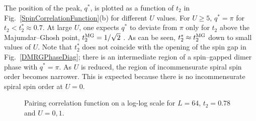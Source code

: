 The position of the peak, $q^\ast$, is plotted as a function of $t_2$ in 
Fig.\ \ref{SpinCorrelationFunction}(b) for different $U$ values.
For $U\geq 5$, 
$q^\ast=\pi$ for $t_2 < t_2^\ast \approx 0.7$.
At large $U$, one expects $q^\ast$ to deviate from $\pi$ only for $t_2$
above the Majumdar--Ghosh point, 
$t_2^{\rm MG}=1/\sqrt{2}$ \cite{WhiteAffleck}.
As can be seen, $t_2^\ast \approx t_2^{\rm MG}$ down to small values
of $U$. 
Note that $t_2^\ast$ does not coincide with the opening of the spin gap in 
Fig.\ \ref{DMRGPhaseDiag}; there is an  
intermediate region of a spin--gapped dimer phase with $q^\ast=\pi$.
As $U$ is reduced, the region of incommensurate
spiral spin order becomes narrower. 
This is expected because there is no incommensurate spiral spin 
order at $U=0$. 

\begin{figure}[htb]
\begin{center}
\end{center}
\caption{Pairing correlation function on a log-log scale for $L=64$, 
    $t_2=0.78$ and $U=0,1$. } 
\label{PairingCorrelationFunction}
\end{figure}

